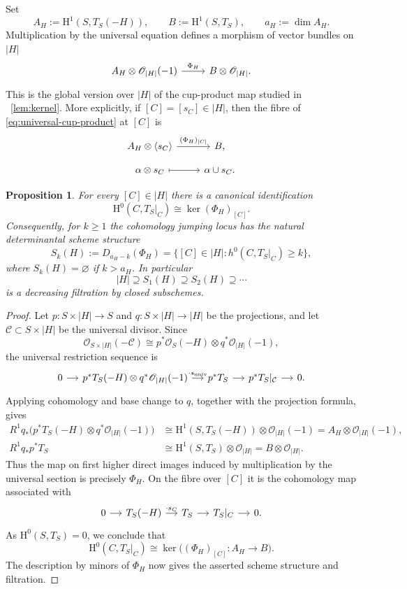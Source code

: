 \documentclass[a4paper,12pt,twoside,reqno]{amsart}
\makeatletter
\numberwithin{equation}{section}
\def\cr@pref#1:#2\@nil{#1}
\newcommand{\cr@tsing}[1]{\@nameuse{cr@map@\cr@pref#1:\@nil}}
\newcommand{\Cref}[1]{\cr@tsing{#1}~\ref{#1}}
\theoremstyle{plain}
\newtheorem{proposition}[theorem]{Proposition}
\theoremstyle{definition}
\newcommand{\Oc}{\mathscr{O}}
\newcommand{\HH}{\mathrm{H}}
\theoremstyle{plain}
\theoremstyle{definition}
\makeatother
\begin{document}
Set
\[
A_H:=\HH^1(S,T_S(-H)),\qquad B:=\HH^1(S,T_S),\qquad a_H:=\dim A_H.
\]
Multiplication by the universal equation defines a morphism of vector bundles on $|H|$
\begin{equation}\label{eq:universal-cup-product}
\begin{tikzcd}
A_H\otimes\Oc_{|H|}(-1) \arrow[r, "\Phi_H"]
& B\otimes\Oc_{|H|}.
\end{tikzcd}
\end{equation}
This is the global version over $|H|$ of the cup-product map studied in \Cref{lem:kernel}.
More explicitly, if $[C]=[s_C]\in |H|$, then the fibre of \eqref{eq:universal-cup-product} at $[C]$ is 
\[
\begin{tikzcd}[row sep=small]
A_H\otimes\langle s_C\rangle \arrow[r, "(\Phi_H)_{[C]}"] & B,\\
\alpha\otimes s_C \arrow[r, mapsto] & \alpha\cup s_C.
\end{tikzcd}
\]

\begin{proposition}\label{prop:jumping-determinantal}
For every $[C]\in |H|$ there is a canonical identification
\[
\HH^0(C,T_S|_C)\cong\ker(\Phi_H)_{[C]}.
\]
Consequently, for $k\ge1$ the cohomology jumping locus has the natural determinantal scheme structure
\[
S_k(H):=D_{a_H-k}(\Phi_H)
       =\{[C]\in |H|:h^0(C,T_S|_C)\ge k\},
\]
where $S_k(H)=\varnothing$ if $k>a_H$. In particular
\[
|H|\supseteq S_1(H)\supseteq S_2(H)\supseteq\cdots
\]
is a decreasing filtration by closed subschemes.
\end{proposition}

\begin{proof}
Let $p\colon S\times |H|\to S$ and $q\colon S\times |H|\to |H|$ be the projections, and let $\mathcal C\subset S\times |H|$ be the universal divisor. Since
\[
\Oc_{S\times |H|}(-\mathcal C)
\cong p^*\Oc_S(-H)\otimes q^*\Oc_{|H|}(-1),
\]
the universal restriction sequence is
\[
\begin{tikzcd}[column sep=small]
0 \arrow[r]
& p^*T_S(-H)\otimes q^*\Oc_{|H|}(-1)
\arrow[r, "\cdot s_{\mathrm{univ}}"]
& p^*T_S \arrow[r] & p^*T_S|_{\mathcal C} \arrow[r] & 0.
\end{tikzcd}
\]
Applying cohomology and base change to $q$, together with the projection formula, gives
\[
\begin{aligned}
R^1q_*\bigl(p^*T_S(-H)\otimes q^*\Oc_{|H|}(-1)\bigr)
&\cong \HH^1(S,T_S(-H))\otimes\Oc_{|H|}(-1)
 = A_H\otimes\Oc_{|H|}(-1),\\
R^1q_*p^*T_S
&\cong \HH^1(S,T_S)\otimes\Oc_{|H|}
 = B\otimes\Oc_{|H|}.
\end{aligned}
\]
Thus the map on first higher direct images induced by multiplication by the universal section is precisely $\Phi_H$. On the fibre over $[C]$ it is the cohomology map associated with
\[
\begin{tikzcd}[column sep=small]
0 \arrow[r] & T_S(-H) \arrow[r, "\cdot s_C"]
& T_S \arrow[r] & T_S|_C \arrow[r] & 0.
\end{tikzcd}
\]
As $\HH^0(S,T_S)=0$, we conclude that
\[
\HH^0(C,T_S|_C)
\cong\ker\bigl((\Phi_H)_{[C]}\colon A_H\to B\bigr).
\]
The description by minors of $\Phi_H$ now gives the asserted scheme structure and filtration.
\end{proof}
\end{document}
